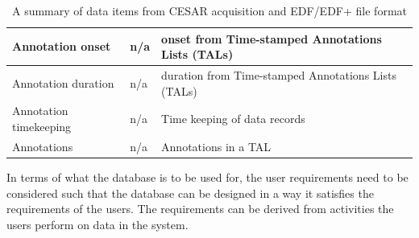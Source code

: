 \begin{table}
\begin{center}
\begin{tabular}{ |p{5cm}||p{4.5cm}|p{5.5cm}|  }
 \hline
 Annotation onset& n/a& onset from Time-stamped Annotations Lists (TALs)\\
 \hline
 Annotation duration& n/a& duration from Time-stamped Annotations Lists (TALs)\\
 \hline
 Annotation timekeeping& n/a& Time keeping of data records\\
 \hline
 Annotations & n/a& Annotations in a TAL\\
 \hline
\end{tabular}
\end{center}
\caption{A summary of data items from CESAR acquisition and EDF/EDF+ file format}
\label{tab:Datasources}
\end{table}
In terms of what the database is to be used for, the user requirements need to be considered such that the database can be designed in a way it satisfies the requirements of the users. The requirements can be derived from activities the users perform on data in the system. 
